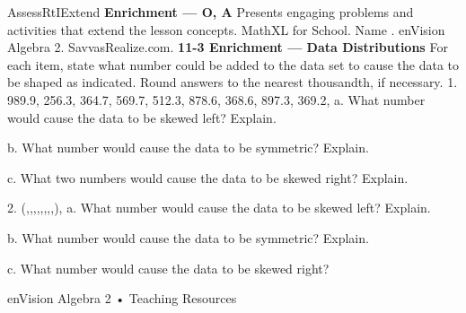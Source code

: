 \documentclass{article}
\newenvironment{te-addendum}[2]{}{}     %
\newcommand{\answer}[1]{}               %
\newcommand{\te}[1]{}                   %
\begin{document}
\begin{te-addendum}{Assess}{RtIExtend}
\textbf{Enrichment — O, A}
Presents engaging problems and activities that extend the lesson concepts.
MathXL for School. Name \underline{\hspace{2cm}}. enVision Algebra 2. SavvasRealize.com.
\textbf{11-3 Enrichment — Data Distributions}
For each item, state what number could be added to the data set to cause the data to be shaped as indicated. Round answers to the nearest thousandth, if necessary.
1. 989.9, 256.3, 364.7, 569.7, 512.3, 878.6, 368.6, 897.3, 369.2, \underline{\hspace{1cm}}
a. What number would cause the data to be skewed left? Explain.
\answer{Answers may vary. Sample: −1,000; mean = 420.66; median = 440.75; The mean is less than the median, so the data are skewed left.}
b. What number would cause the data to be symmetric? Explain.
\answer{Answers may vary. Sample: −799.1; mean = 440.75; median = 440.75; the mean is equal to the median, so the data are symmetric.}
\te{Printed equal mean and median as sufficient for symmetry; the displayed data with −799.1 are not symmetric.}
c. What two numbers would cause the data to be skewed right? Explain.
\answer{Answers may vary. Sample: 200; mean = 540.66; median = 440.75; The mean is greater than the median, so the data are skewed right.}
\te{Printed two numbers in the question but only one number in the sample answer.}
2. (,,,,,,,,), \underline{\hspace{1cm}}
a. What number would cause the data to be skewed left? Explain.
\answer{Answers may vary. Sample: 0.25; mean: 0.495; median: 0.613; The mean is less than the median, so the data are skewed left.}
b. What number would cause the data to be symmetric? Explain.
\answer{Answers may vary. Sample: 1.624; mean: 0.633; median: 0.633; The mean is equal to the median, so the data are symmetric.}
c. What number would cause the data to be skewed right?
\answer{Answers may vary. Sample: 3.3; mean: 0.823; median: 0.633; The mean is greater than the median, so the data are skewed right.}
\te{Printed numerical keys for Item 2 do not agree with the displayed fractions; for example, adding 0.25 gives a median of approximately 0.533, rather than 0.613.}
enVision Algebra 2 • Teaching Resources
\end{te-addendum}
\end{document}
